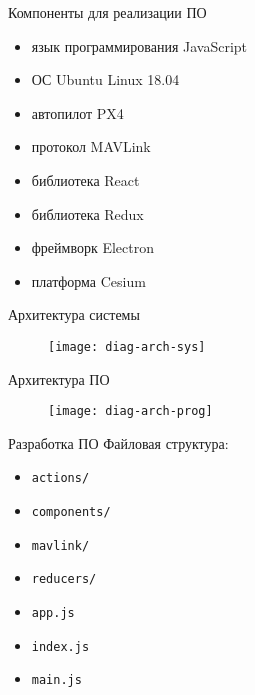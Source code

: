 \documentclass[aspectratio=169]{beamer}
\begin{document}
\begin{frame}{Компоненты для реализации ПО}
  \begin{itemize}
    \item язык программирования JavaScript
    \item ОС Ubuntu Linux 18.04
    \item автопилот PX4
    \item протокол MAVLink
    \item библиотека React
    \item библиотека Redux
    \item фреймворк Electron
    \item платформа Cesium
  \end{itemize}
\end{frame}


\begin{frame}{Архитектура системы}
  \begin{figure}[!h]
    \begin{center}
      \texttt{[image: diag-arch-sys]}
    \end{center}
  \end{figure}
\end{frame}


\begin{frame}{Архитектура ПО}
  \begin{figure}[!h]
    \begin{center}
      \texttt{[image: diag-arch-prog]}
    \end{center}
  \end{figure}
\end{frame}


\begin{frame}{Разработка ПО}
  Файловая структура:

  \begin{itemize}
    \item \texttt{actions/}
    \item \texttt{components/}
    \item \texttt{mavlink/}
    \item \texttt{reducers/}
    \item \texttt{app.js}
    \item \texttt{index.js}
    \item \texttt{main.js}
  \end{itemize}
\end{frame}
\end{document}
